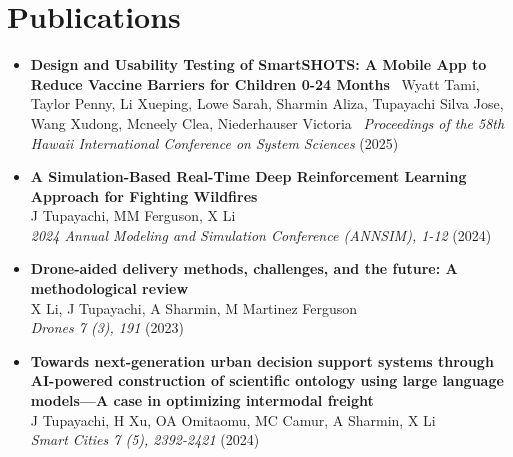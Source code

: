 \documentclass[10pt, letterpaper]{article}
\newenvironment{twocolentry}[2][]{
    \onecolentry
    \def\secondColumn{#2}
    \setcolumnwidth{\fill, 4.5 cm}
    \begin{paracol}{2}
}{
    \switchcolumn \raggedleft \secondColumn
    \end{paracol}
    \endonecolentry
} %
\begin{document}




    \section*{Publications}

    \begin{itemize}[left=0pt] %

        \item \textbf{Design and Usability Testing of SmartSHOTS: A Mobile App to Reduce Vaccine Barriers for Children 0-24 Months} \ Wyatt Tami, Taylor Penny, Li Xueping, Lowe Sarah, Sharmin Aliza, Tupayachi Silva Jose, Wang Xudong, Mcneely Clea, Niederhauser Victoria \ \textit{Proceedings of the 58th Hawaii International Conference on System Sciences} (2025) \


        \item \textbf{A Simulation-Based Real-Time Deep Reinforcement Learning Approach for Fighting Wildfires} \\
        J Tupayachi, MM Ferguson, X Li \\
        \textit{2024 Annual Modeling and Simulation Conference (ANNSIM), 1-12} (2024) \\

        \item \textbf{Drone-aided delivery methods, challenges, and the future: A methodological review} \\
        X Li, J Tupayachi, A Sharmin, M Martinez Ferguson \\
        \textit{Drones 7 (3), 191} (2023) \\
    
        \item \textbf{Towards next-generation urban decision support systems through AI-powered construction of scientific ontology using large language models—A case in optimizing intermodal freight} \\
        J Tupayachi, H Xu, OA Omitaomu, MC Camur, A Sharmin, X Li \\
        \textit{Smart Cities 7 (5), 2392-2421} (2024) \\
    

\end{itemize}
\end{document}
